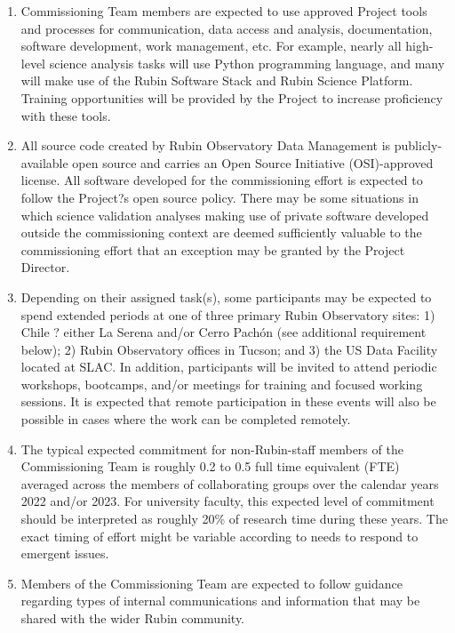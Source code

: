 \documentclass[SE,authoryear,toc]{lsstdoc}
\begin{document}
\begin{enumerate}
\item Commissioning Team members are expected to use approved Project tools and processes for communication, data access and analysis, documentation, software development, work management, etc. For example, nearly all high-level science analysis tasks will use Python programming language, and many will make use of the Rubin Software Stack and Rubin Science Platform. Training opportunities will be provided by the Project to increase proficiency with these tools. 

\item All source code created by Rubin Observatory Data Management is publicly-available open source and carries an Open Source Initiative (OSI)-approved license. All software developed for the commissioning effort is expected to follow the Project?s open source policy. There may be some situations in which science validation analyses making use of private software developed outside the commissioning context are deemed sufficiently valuable to the commissioning effort that an exception may be granted by the Project Director. 

\item Depending on their assigned task(s), some participants may be expected to spend extended periods at one of three primary Rubin Observatory sites: 1) Chile ? either La Serena and/or Cerro Pach\'{o}n (see additional requirement below); 2) Rubin Observatory offices in Tucson; and 3) the US Data Facility located at SLAC. In addition, participants will be invited to attend periodic workshops, bootcamps, and/or meetings for training and focused working sessions. It is expected that remote participation in these events will also be possible in cases where the work can be completed remotely.


\item The typical expected commitment for non-Rubin-staff members of the Commissioning Team is roughly 0.2 to 0.5 full time equivalent (FTE) averaged across the members of collaborating groups over the calendar years 2022 and/or 2023. For university faculty, this expected level of commitment should be interpreted as roughly 20\% of research time during these years. The exact timing of effort might be variable according to needs to respond to emergent issues. 

\item Members of the Commissioning Team are expected to follow guidance regarding types of internal communications and information that may be shared with the wider Rubin community.


\end{enumerate}
\end{document}
